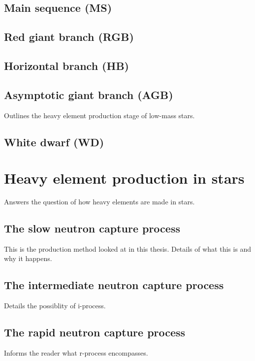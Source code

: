 \subsection{Main sequence (MS)}

\subsection{Red giant branch (RGB)}

\subsection{Horizontal branch (HB)}

\subsection{Asymptotic giant branch (AGB)}

Outlines the heavy element production stage of low-mass stars.

\subsection{White dwarf (WD)}

\section{Heavy element production in stars}

Answers the question of how heavy elements are made in stars.

\subsection{The slow neutron capture process}

This is the production method looked at in this thesis. Details of what this is and why it happens.

\subsection{The intermediate neutron capture process}

Details the possiblity of i-process.

\subsection{The rapid neutron capture process}

Informs the reader what r-process encompasses.